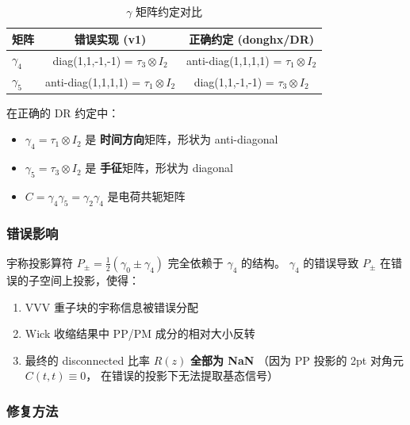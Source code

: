 \documentclass[11pt,a4paper]{article}
\begin{document}
\newcommand{\correct}[1]{\textcolor{green!60!black}{#1}}
\newcommand{\wrong}[1]{\textcolor{red!70!black}{#1}}

\begin{table}[H]
  \centering
  \caption{$\gamma$ 矩阵约定对比}
  \begin{tabular}{lcc}
    \toprule
    矩阵 & 错误实现 (v1) & 正确约定 (donghx/DR) \\
    \midrule
    $\gamma_4$ & \wrong{diag(1,1,-1,-1) = $\tau_3 \otimes I_2$}
                 & \correct{anti-diag(1,1,1,1) = $\tau_1 \otimes I_2$} \\
    $\gamma_5$ & \wrong{anti-diag(1,1,1,1) = $\tau_1 \otimes I_2$}
                 & \correct{diag(1,1,-1,-1) = $\tau_3 \otimes I_2$} \\
    \bottomrule
  \end{tabular}
\end{table}

在正确的 DR 约定中：
\begin{itemize}
  \item $\gamma_4 = \tau_1 \otimes I_2$ 是 \textbf{时间方向}矩阵，形状为 anti-diagonal
  \item $\gamma_5 = \tau_3 \otimes I_2$ 是 \textbf{手征}矩阵，形状为 diagonal
  \item $C = \gamma_4 \gamma_5 = \gamma_2 \gamma_4$ 是电荷共轭矩阵
\end{itemize}

\subsubsection*{错误影响}

宇称投影算符 $P_{\pm} = \frac{1}{2}(\gamma_0 \pm \gamma_4)$ 完全依赖于 $\gamma_4$ 的结构。
$\gamma_4$ 的错误导致 $P_{\pm}$ 在错误的子空间上投影，使得：

\begin{enumerate}[leftmargin=*]
  \item VVV 重子块的宇称信息被错误分配
  \item Wick 收缩结果中 PP/PM 成分的相对大小反转
  \item 最终的 disconnected 比率 $R(z)$ \textbf{全部为 NaN}
        （因为 PP 投影的 2pt 对角元 $C(t,t) \equiv 0$，
        在错误的投影下无法提取基态信号）
\end{enumerate}

\subsubsection*{修复方法}
\end{document}
